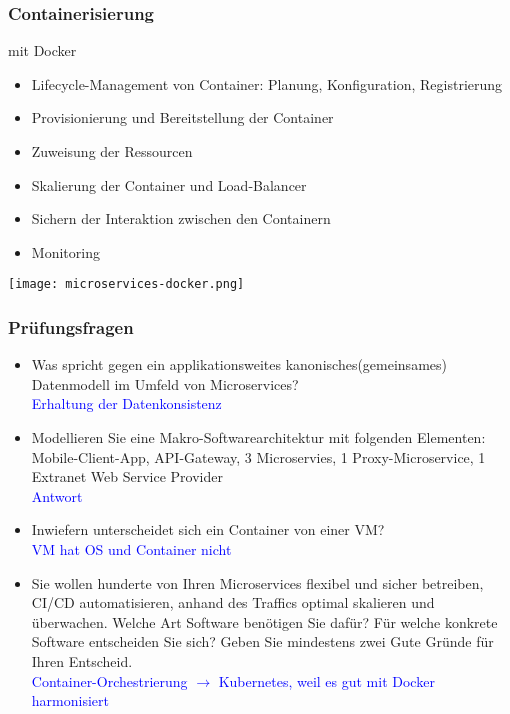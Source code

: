 \subsubsection{Containerisierung}

mit Docker

\begin{itemize}
    \item Lifecycle-Management von Container: Planung, Konfiguration, Registrierung
    \item Provisionierung und Bereitstellung der Container
    \item Zuweisung der Ressourcen
    \item Skalierung der Container und Load-Balancer
    \item Sichern der Interaktion zwischen den Containern
    \item Monitoring
\end{itemize}

\texttt{[image: microservices-docker.png]}

\subsubsection{Prüfungsfragen}

\begin{itemize}
    \item Was spricht gegen ein applikationsweites kanonisches(gemeinsames) Datenmodell im Umfeld von Microservices? \\
    \textcolor{blue}{Erhaltung der Datenkonsistenz}
    \item Modellieren Sie eine Makro-Softwarearchitektur mit folgenden Elementen: Mobile-Client-App, API-Gateway, 3 Microservies, 1 Proxy-Microservice, 1 Extranet Web Service Provider \\
    \textcolor{blue}{Antwort}
    \item Inwiefern unterscheidet sich ein Container von einer VM? \\
    \textcolor{blue}{VM hat OS und Container nicht}
    \item Sie wollen hunderte von Ihren Microservices flexibel und sicher betreiben, CI/CD automatisieren, anhand des Traffics optimal skalieren und überwachen. Welche Art Software benötigen Sie dafür? Für welche konkrete Software entscheiden Sie sich? Geben Sie mindestens zwei Gute Gründe für Ihren Entscheid. \\
    \textcolor{blue}{Container-Orchestrierung $\rightarrow$ Kubernetes, weil es gut mit Docker harmonisiert}
\end{itemize}


